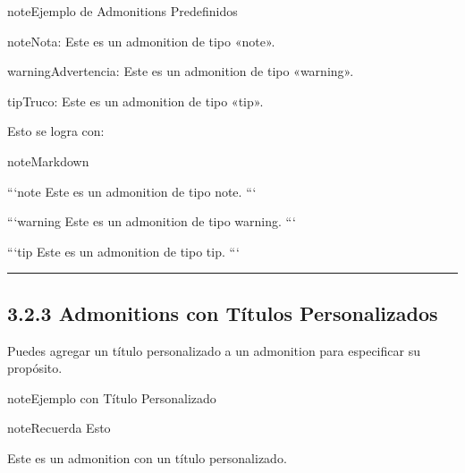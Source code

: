 \documentclass[a4paper,10pt,spanish]{sphinxmanual}
\begin{document}
\begin{sphinxadmonition}{note}{Ejemplo de Admonitions Predefinidos}

\begin{sphinxadmonition}{note}{Nota:}
\sphinxAtStartPar
Este es un admonition de tipo «note».
\end{sphinxadmonition}

\begin{sphinxadmonition}{warning}{Advertencia:}
\sphinxAtStartPar
Este es un admonition de tipo «warning».
\end{sphinxadmonition}

\begin{sphinxadmonition}{tip}{Truco:}
\sphinxAtStartPar
Este es un admonition de tipo «tip».
\end{sphinxadmonition}
\end{sphinxadmonition}

\sphinxAtStartPar
Esto se logra con:

\begin{sphinxadmonition}{note}{Markdown}

\begin{sphinxVerbatim}[commandchars=\\\{\}]
```\PYGZob{}note\PYGZcb{}
Este es un admonition de tipo \PYGZdq{}note\PYGZdq{}.
```

```\PYGZob{}warning\PYGZcb{}
Este es un admonition de tipo \PYGZdq{}warning\PYGZdq{}.
```

```\PYGZob{}tip\PYGZcb{}
Este es un admonition de tipo \PYGZdq{}tip\PYGZdq{}.
```
\end{sphinxVerbatim}
\end{sphinxadmonition}


\bigskip\hrule\bigskip



\subsection{3.2.3 Admonitions con Títulos Personalizados}
\label{\detokenize{3_guia_myst/advertencias:admonitions-con-titulos-personalizados}}
\sphinxAtStartPar
Puedes agregar un título personalizado a un admonition para especificar su propósito.

\begin{sphinxadmonition}{note}{Ejemplo con Título Personalizado}

\begin{sphinxadmonition}{note}{Recuerda Esto}

\sphinxAtStartPar
Este es un admonition con un título personalizado.
\end{sphinxadmonition}
\end{sphinxadmonition}
\end{document}
